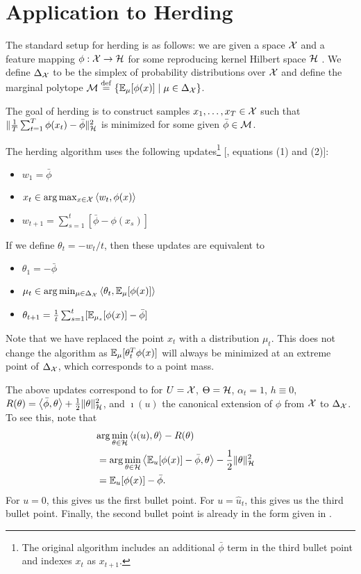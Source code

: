 \documentclass[paper.tex]{subfiles}
\begin{document}
\section{Application to Herding}
\label{sec:herding}

The standard setup for herding is as follows: we are given a 
space $\mathcal{X}$ and a feature mapping $\phi : \mathcal{X} \to \mathcal{H}$ for some 
reproducing kernel Hilbert space $\mathcal{H}$ \cite{RKHS}. 
We define $\Delta_{\mathcal{X}}$ to be the simplex 
of probability distributions over $\mathcal{X}$ and define the marginal polytope 
$\mathcal{M} \stackrel{\mathrm{def}}{=} \{\mathbb{E}_{\mu}[\phi(x)] \mid \mu \in \Delta_{\mathcal{X}}\}$.

The goal of herding is to construct samples $x_1,\ldots,x_T \in \mathcal{X}$ 
such that $\|\frac{1}{T}\sum_{t=1}^T \phi(x_t)-\bar{\phi}\|_{\mathcal{H}}^2$ 
is minimized for some given $\bar{\phi} \in \mathcal{M}$.

The herding algorithm uses the following updates\footnote{The original 
algorithm includes an additional $\bar{\phi}$ term in the third bullet 
point and indexes $x_t$ as $x_{t+1}$.} [\cite{Chen:2010}, equations (1) and (2)]:
\begin{itemize}
\item $w_1 = \bar{\phi}$
\item $x_t \in \arg\max_{x \in \mathcal{X}} \left\langle w_t, \phi(x) \right\rangle$
\item $w_{t+1} = \sum_{s=1}^t [\bar{\phi}-\phi(x_s)]$
\end{itemize}
If we define $\theta_t = -w_t/t$, then these updates are equivalent to
\begin{itemize}
\item $\theta_1 = -\bar{\phi}$
\item $\mu_t \in \arg\min_{\mu \in \Delta_{\mathcal{X}}} \left\langle \theta_t, \mathbb{E}_{\mu}[\phi(x)] \right\rangle$
\item $\theta_{t+1} = \frac{1}{t} \sum_{s=1}^t [\mathbb{E}_{\mu_s}[\phi(x)] - \bar{\phi}]$
\end{itemize}
Note that we have replaced the point $x_t$ with a distribution $\mu_t$. 
This does not change the algorithm as $\mathbb{E}_{\mu}[\theta_t^T\phi(x)]$ will 
always be minimized at an extreme point of $\Delta_{\mathcal{X}}$, which corresponds 
to a point mass.

The above updates correspond to \dual for $U = \mathcal{X}$, $\Theta = \mathcal{H}$, 
$\alpha_t = 1$, $h \equiv 0$, 
$R(\theta) = \left\langle \bar{\phi}, \theta \right\rangle + \frac{1}{2}\|\theta\|_{\mathcal{H}}^2$, 
and $\imath(u)$ the canonical extension of $\phi$ from $\mathcal{X}$ to $\Delta_{\mathcal{X}}$.
To see this, note that 
\begin{align}
\lefteqn{\arg\min_{\theta \in \sH} \ip{\imath(u)}{\theta} - R(\theta)} \\
 &= \arg\min_{\theta \in \sH} \ip{\bE_{u}[\phi(x)]-\bar{\phi}}{\theta} - \frac{1}{2}\|\theta\|_{\sH}^2 \\
 &= \bE_u[\phi(x)] - \bar{\phi}.
\end{align}
For $u = 0$, this gives us the first bullet point. For $u = \hat{u}_t$, 
this gives us the third bullet point. Finally, the second bullet point 
is already in the form given in \dual.
\end{document}
